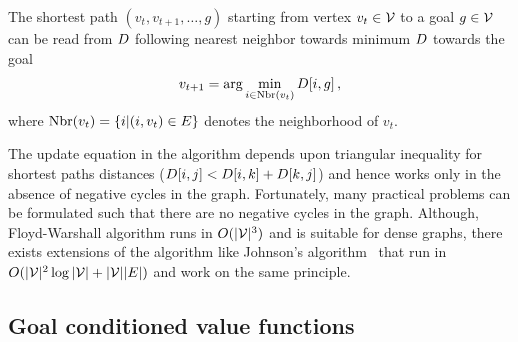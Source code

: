 The shortest path $(v_t, v_{t+1}, \dots, g)$ starting from vertex $v_t \in
\mathcal{V}$ to a goal $g \in \mathcal{V}$ can be read from $D$ following
nearest neighbor towards minimum $D$ towards the goal
%
\begin{align}
  v_{t+1} = \arg \min_{i \in \text{Nbr}(v_t)} D[i, g] \, ,
\end{align}%
%
where $\text{Nbr}(v_t) = \{ i | (i, v_t) \in E \} $ denotes the
neighborhood of $v_t$.

The update equation in the algorithm depends upon triangular inequality for
shortest paths distances ($D[i, j] < D[i, k] + D[k, j]$) and hence
works only in the absence of negative cycles in the graph. Fortunately, many
practical problems can be formulated such that there are no negative cycles
in the graph. Although, Floyd-Warshall algorithm runs in $O(|\mathcal{V}|^3)$
and is suitable for dense graphs, there exists extensions of the algorithm
like Johnson's algorithm~\citep{johnson1977efficient} that run in
$O(|\mathcal{V}|^2\log|\mathcal{V}| + |\mathcal{V}||E|)$ and work on the same
principle.


\subsection{Goal conditioned value functions}

